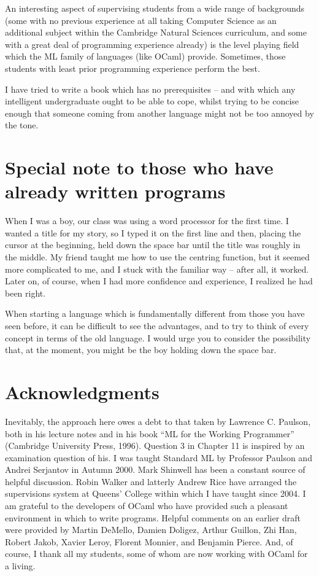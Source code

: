 \documentclass[]{book}
\begin{document}
An interesting aspect of supervising students from a wide range of backgrounds (some with no previous experience at all taking Computer Science as an additional subject within the Cambridge Natural Sciences curriculum, and some with a great deal of programming experience already) is the level playing field which the ML family of languages (like OCaml) provide. Sometimes, those students with least prior programming experience perform the best.

I have tried to write a book which has no prerequisites -- and with which any intelligent undergraduate ought to be able to cope, whilst trying to be concise enough that someone coming from another language might not be too annoyed by the tone.

\section*{Special note to those who have already written programs}
When I was a boy, our class was using a word processor for the first time. I wanted a title for my story, so I typed it on the first line and then, placing the cursor at the beginning, held down the space bar until the title was roughly in the middle. My friend taught me how to use the centring function, but it seemed more complicated to me, and I stuck with the familiar way -- after all, it worked. Later on, of course, when I had more confidence and experience, I realized he had been right.

When starting a language which is fundamentally different from those you have seen before, it can be difficult to see the advantages, and to try to think of every concept in terms of the old language. I would urge you to consider the possibility that, at the moment, you might be the boy holding down the space bar.

\section*{Acknowledgments}

Inevitably, the approach here owes a debt to that taken by Lawrence C. Paulson, both in his lecture notes and in his book ``ML for the Working Programmer'' (Cambridge University Press, 1996). Question 3 in Chapter 11 is inspired by an examination question of his. I was taught Standard ML by Professor Paulson and Andrei Serjantov in Autumn 2000. Mark Shinwell has been a constant source of helpful discussion. Robin Walker and latterly Andrew Rice have arranged the supervisions system at Queens' College within which I have taught since 2004. I am grateful to the developers of OCaml who have provided such a pleasant environment in which to write programs. Helpful comments on an earlier draft were provided by Martin DeMello, Damien Doligez, Arthur Guillon, Zhi Han, Robert Jakob, Xavier Leroy, Florent Monnier, and Benjamin Pierce. And, of course, I thank all my students, some of whom are now working with OCaml for a living.
\end{document}
